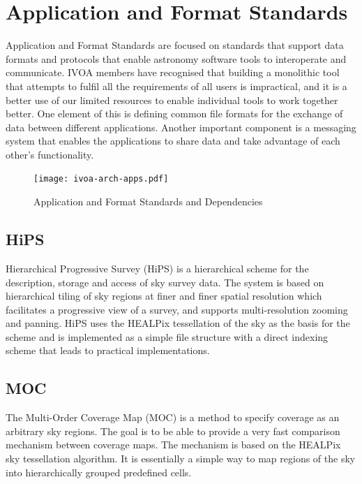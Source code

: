 \documentclass[11pt,letter]{ivoa}
\begin{document}
\section{Application and Format Standards}

Application and Format Standards are focused on standards that support
data formats and
protocols that enable astronomy software tools to interoperate and
communicate. IVOA
members have recognised that building a monolithic tool that attempts to
fulfil all the
requirements of all users is impractical, and it is a better use of our
limited resources
to enable individual tools to work together better. One element of this
is defining
common file formats for the exchange of data between different
applications. Another
important component is a messaging system that enables the applications
to share data
and take advantage of each other's functionality.

\begin{figure}[ht]
\centering
\texttt{[image: ivoa-arch-apps.pdf]}
\caption{Application and Format Standards and Dependencies}
\label{fig:appsdeps}
\end{figure}

\subsection{HiPS}

Hierarchical Progressive Survey (HiPS) \citep{2017ivoa.spec.0519F} is a
hierarchical scheme for the description, storage and
access of sky survey data. The system is based on hierarchical tiling of
sky regions at
finer and finer spatial resolution which facilitates a progressive view
of a survey, and
supports multi-resolution zooming and panning. HiPS uses the HEALPix
tessellation of the
sky as the basis for the scheme and is implemented as a simple file
structure with a direct
indexing scheme that leads to practical implementations. 

\subsection{MOC}

The Multi-Order Coverage Map (MOC) \citep{2022ivoa.spec.0727F} is a
method to specify coverage as an arbitrary sky regions.
The goal is to be able to provide a very fast comparison mechanism
between coverage maps.
The mechanism is based on the HEALPix sky tessellation algorithm. It is
essentially a
simple way to map regions of the sky into hierarchically grouped
predefined cells.
\end{document}

